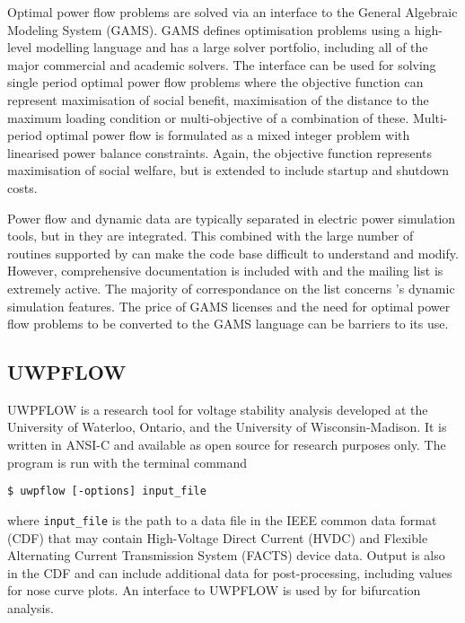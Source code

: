 Optimal power flow problems are solved via an interface to the General
Algebraic Modeling System (GAMS).  GAMS defines optimisation
problems using a high-level modelling language and has a large solver portfolio, including all
of the major commercial and academic solvers.  The interface can be used for
solving single period optimal power flow problems where the objective function
can represent maximisation of social benefit, maximisation of the distance to
the maximum loading condition or multi-objective of a combination of these.
Multi-period optimal power flow is formulated as a mixed integer problem with
linearised power balance constraints.  Again, the objective function represents
maximisation of social welfare, but is extended to include startup and
shutdown costs.

Power flow and dynamic data are typically separated in electric power
simulation tools, but in \psat they are integrated.  This combined with the
large number of routines supported by \psat can make the code base difficult to
understand and modify.  However, comprehensive documentation is included with
\psat and the mailing list is extremely active.  The majority of correspondance
on the list concerns \psat's dynamic simulation features.  The price of
GAMS licenses and the need for optimal power flow problems to be converted to
the GAMS language can be barriers to its use.

\subsection{UWPFLOW}
UWPFLOW is a research tool for voltage stability analysis developed at the
University of Waterloo, Ontario, and the University of Wisconsin-Madison.  It
is written in ANSI-C and available as open source for research purposes only.
The program is run with the terminal command
\begin{center}
\begin{verbatim}
$ uwpflow [-options] input_file
\end{verbatim}
\end{center}
where \texttt{input\_file} is the path to a data file in the IEEE common data
format (CDF) \cite{cdf:73} that may contain High-Voltage Direct Current (HVDC)
and Flexible Alternating Current Transmission System (FACTS) device data.
Output is also in the CDF and can include additional data for post-processing,
including values for nose curve plots.  An interface to UWPFLOW is used by \psat
for bifurcation analysis.

